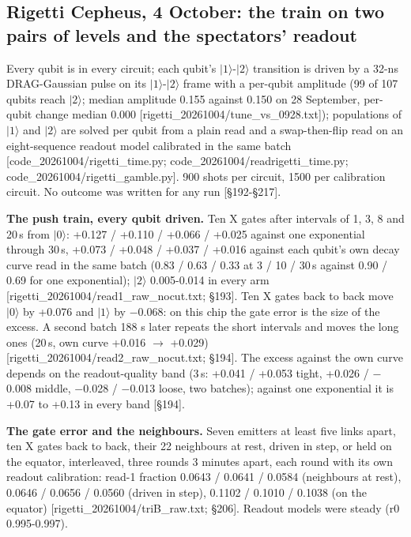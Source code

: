 \documentclass[11pt]{article}
\begin{document}
\subsection{Rigetti Cepheus, 4 October: the train on two pairs of levels and the spectators' readout}
Every qubit is in every circuit; each qubit's \(|1\rangle\)-\(|2\rangle\) transition is driven by a 32-ns DRAG-Gaussian pulse on its \(|1\rangle\)-\(|2\rangle\) frame with a per-qubit amplitude (99 of 107 qubits reach \(|2\rangle\); median amplitude 0.155 against 0.150 on 28 September, per-qubit change median 0.000 {[}rigetti\_20261004/tune\_vs\_0928.txt{]}); populations of \(|1\rangle\) and \(|2\rangle\) are solved per qubit from a plain read and a swap-then-flip read on an eight-sequence readout model calibrated in the same batch {[}code\_20261004/rigetti\_time.py; code\_20261004/readrigetti\_time.py; code\_20261004/rigetti\_gamble.py{]}. 900 shots per circuit, 1500 per calibration circuit. No outcome was written for any run {[}\S{}192-\S{}217{]}.

\textbf{The push train, every qubit driven.} Ten X gates after intervals of 1, 3, 8 and 20\,\textmu s from \(|0\rangle\): +0.127 / +0.110 / +0.066 / +0.025 against one exponential through 30\,\textmu s, +0.073 / +0.048 / +0.037 / +0.016 against each qubit's own decay curve read in the same batch (0.83 / 0.63 / 0.33 at 3 / 10 / 30\,\textmu s against 0.90 / 0.69 for one exponential); \(|2\rangle\) 0.005-0.014 in every arm {[}rigetti\_20261004/read1\_raw\_nocut.txt; \S{}193{]}. Ten X gates back to back move \(|0\rangle\) by +0.076 and \(|1\rangle\) by \(-\)0.068: on this chip the gate error is the size of the excess. A second batch 188 s later repeats the short intervals and moves the long ones (20\,\textmu s, own curve +0.016 \(\to\) +0.029) {[}rigetti\_20261004/read2\_raw\_nocut.txt; \S{}194{]}. The excess against the own curve depends on the readout-quality band (3\,\textmu s: +0.041 / +0.053 tight, +0.026 / \(-\)0.008 middle, \(-\)0.028 / \(-\)0.013 loose, two batches); against one exponential it is +0.07 to +0.13 in every band {[}\S{}194{]}.

\textbf{The gate error and the neighbours.} Seven emitters at least five links apart, ten X gates back to back, their 22 neighbours at rest, driven in step, or held on the equator, interleaved, three rounds 3 minutes apart, each round with its own readout calibration: read-1 fraction 0.0643 / 0.0641 / 0.0584 (neighbours at rest), 0.0646 / 0.0656 / 0.0560 (driven in step), 0.1102 / 0.1010 / 0.1038 (on the equator) {[}rigetti\_20261004/triB\_raw.txt; \S{}206{]}. Readout models were steady (r0 0.995-0.997).
\end{document}
